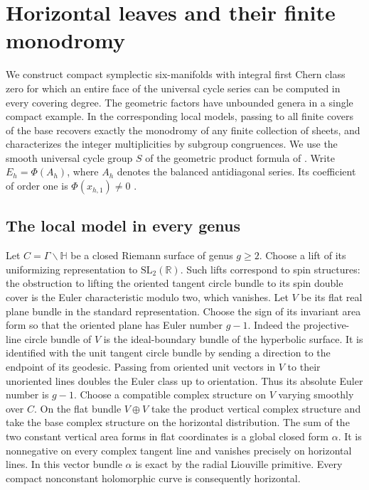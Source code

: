 \section{Horizontal leaves and their finite monodromy}\label{sec:horizontal}
We construct compact symplectic six-manifolds with integral first Chern class zero for which an entire face of the universal cycle series can be computed in every covering degree. The geometric factors have unbounded genera in a single compact example. In the corresponding local models, passing to all finite covers of the base recovers exactly the monodromy of any finite collection of sheets, and characterizes the integer multiplicities by subgroup congruences. We use the smooth universal cycle group \(S\) of the geometric product formula of \cite{WueProduct}. Write \(E_h=\Phi(A_h)\), where \(A_h\) denotes the balanced antidiagonal series. Its coefficient of order one is \(\Phi(x_{h,1})\ne0\) \cite{WueProduct}.

\subsection{The local model in every genus}

Let \(C=\Gamma\backslash\mathbb H\) be a closed Riemann surface of genus \(g\ge2\). Choose a lift of its uniformizing representation to \(\mathrm{SL}_2(\mathbb R)\). Such lifts correspond to spin structures: the obstruction to lifting the oriented tangent circle bundle to its spin double cover is the Euler characteristic modulo two, which vanishes. Let \(V\) be its flat real plane bundle in the standard representation. Choose the sign of its invariant area form so that the oriented plane has Euler number \(g-1\). Indeed the projective-line circle bundle of \(V\) is the ideal-boundary bundle of the hyperbolic surface. It is identified with the unit tangent circle bundle by sending a direction to the endpoint of its geodesic. Passing from oriented unit vectors in \(V\) to their unoriented lines doubles the Euler class up to orientation. Thus its absolute Euler number is \(g-1\). Choose a compatible complex structure on \(V\) varying smoothly over \(C\). On the flat bundle \(V\oplus V\) take the product vertical complex structure and take the base complex structure on the horizontal distribution. The sum of the two constant vertical area forms in flat coordinates is a global closed form \(\alpha\). It is nonnegative on every complex tangent line and vanishes precisely on horizontal lines. In this vector bundle \(\alpha\) is exact by the radial Liouville primitive. Every compact nonconstant holomorphic curve is consequently horizontal.

